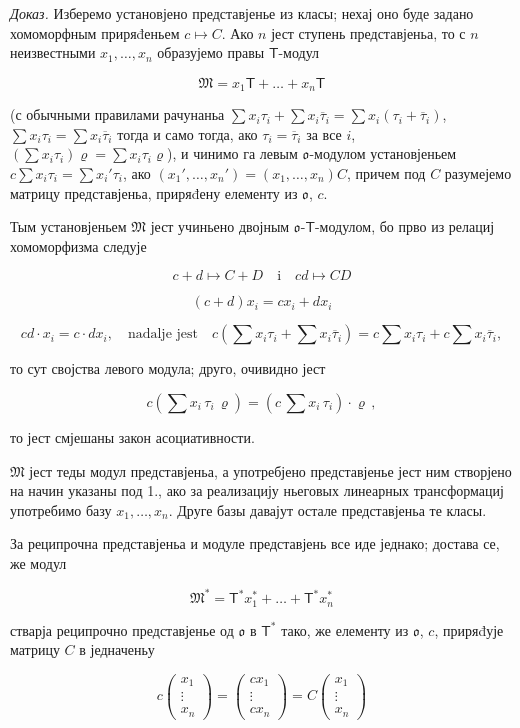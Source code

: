\documentclass[11pt]{article}
\begin{document}
\emph{Доказ.} Изберемо установјено представјенье из класы; нехај оно буде задано хомоморфным приряđеньем \(c\mapsto C\). Ако \(n\) јест ступень представјеньа, то с \(n\) неизвестными \(x_1,\ldots,x_n\) образујемо правы \(\mathsf T\)-модул

\[\mathfrak{M} = x_1 \mathsf{T} + \dots + x_n \mathsf{T}\]

(с обычными правилами рачунаньа \(\sum x_i\tau_i+\sum x_i\overline{\tau}_i=\sum x_i(\tau_i+\overline{\tau}_i)\), \(\sum x_i\tau_i=\sum x_i\overline{\tau}_i\) тогда и само тогда, ако \(\tau_i=\overline{\tau}_i\) за все \(i\), \((\sum x_i\tau_i)\varrho=\sum x_i\tau_i\varrho\)), и чинимо га левым \(\mathfrak{o}\)-модулом установјеньем \(c\sum x_i\tau_i=\sum x_i'\tau_i\), ако \((x_1',\ldots,x_n')=(x_1,\ldots,x_n)C\), причем под \(C\) разумејемо матрицу представјеньа, приряđену елементу из \(\mathfrak{o}\), \(c\).

Тым установјеньем \(\mathfrak M\) јест учиньено двојным \(\mathfrak{o}\)-\(\mathsf T\)-модулом, бо прво из релациј хомоморфизма следује

\[
c+d\mapsto C+D \quad \text{i} \quad cd\mapsto CD
\]

\[
(c+d)x_i=cx_i+dx_i
\]

\[
cd\cdot x_i=c\cdot dx_i,\quad\text{nadalje jest}\quad
c\left(\sum x_i\tau_i+\sum x_i\overline{\tau}_i\right)
=c\sum x_i\tau_i+c\sum x_i\overline{\tau}_i,
\]

то сут својства левого модула; друго, очивидно јест

\[c(\sum x_i \, \tau_i \, \varrho) = (c \, \sum x_i \, \tau_i) \cdot \varrho \,,\]

то јест смјешаны закон асоциативности.

\(\mathfrak{M}\) јест теды модул представјеньа, а употребјено представјенье јест ним створјено на начин указаны под 1., ако за реализацију ньеговых линеарных трансформациј употребимо базу \(x_1, \ldots, x_n\). Друге базы давајут остале представјеньа те класы.

За реципрочна представјеньа и модуле представјень все иде једнако; достава се, же модул

\[\mathfrak{M}^* = \mathsf{T}^* x_1^* + \dots + \mathsf{T}^* x_n^*\]

стварја реципрочно представјенье од \(\mathfrak{o}\) в \(\mathsf T^*\) тако, же елементу из \(\mathfrak{o}\), \(c\), приряđује матрицу \(C\) в једначеньу

\[
c\begin{pmatrix}x_1\\ \vdots\\ x_n\end{pmatrix}
=\begin{pmatrix}cx_1\\ \vdots\\ cx_n\end{pmatrix}
=C\begin{pmatrix}x_1\\ \vdots\\ x_n\end{pmatrix}
\]
\end{document}
